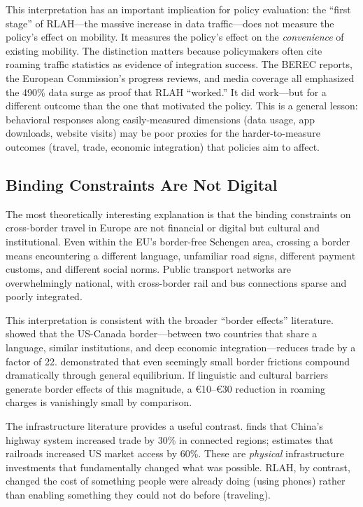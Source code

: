 \documentclass[12pt]{article}
\newcommand{\EUR}[1]{\euro#1}
\begin{document}
This interpretation has an important implication for policy evaluation: the ``first stage'' of RLAH---the massive increase in data traffic---does not measure the policy's effect on mobility. It measures the policy's effect on the \textit{convenience} of existing mobility. The distinction matters because policymakers often cite roaming traffic statistics as evidence of integration success. The BEREC reports, the European Commission's progress reviews, and media coverage all emphasized the 490\% data surge as proof that RLAH ``worked.'' It did work---but for a different outcome than the one that motivated the policy. This is a general lesson: behavioral responses along easily-measured dimensions (data usage, app downloads, website visits) may be poor proxies for the harder-to-measure outcomes (travel, trade, economic integration) that policies aim to affect.

\subsection{Binding Constraints Are Not Digital}

The most theoretically interesting explanation is that the binding constraints on cross-border travel in Europe are not financial or digital but cultural and institutional. Even within the EU's border-free Schengen area, crossing a border means encountering a different language, unfamiliar road signs, different payment customs, and different social norms. Public transport networks are overwhelmingly national, with cross-border rail and bus connections sparse and poorly integrated.

This interpretation is consistent with the broader ``border effects'' literature. \citet{mccallum1995} showed that the US-Canada border---between two countries that share a language, similar institutions, and deep economic integration---reduces trade by a factor of 22. \citet{anderson2003} demonstrated that even seemingly small border frictions compound dramatically through general equilibrium. If linguistic and cultural barriers generate border effects of this magnitude, a \EUR{10}--\EUR{30} reduction in roaming charges is vanishingly small by comparison.

The infrastructure literature provides a useful contrast. \citet{faber2014} finds that China's highway system increased trade by 30\% in connected regions; \citet{donaldson2016} estimates that railroads increased US market access by 60\%. These are \textit{physical} infrastructure investments that fundamentally changed what was possible. RLAH, by contrast, changed the cost of something people were already doing (using phones) rather than enabling something they could not do before (traveling).
\end{document}
